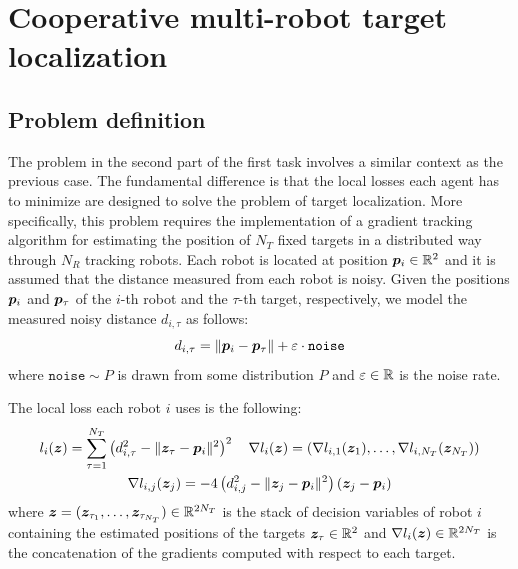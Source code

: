 \documentclass[a4paper,11pt,oneside]{book}
\begin{document}
\chapter{Cooperative multi-robot target localization} \label{ch:localization}


\section{Problem definition}

The problem in the second part of the first task involves a similar context as the previous case. The fundamental difference is that the local losses each agent has to minimize are designed to solve the problem of target localization. More specifically, this problem requires the implementation of a gradient tracking algorithm for estimating the position of $N_T$ fixed targets in a distributed way through $N_R$ tracking robots. Each robot is located at position ${\bm{p}}_i \in {\mathbb{R}}^2$ and it is assumed that the distance measured from each robot is noisy. Given the positions ${\bm{p}}_i$ and ${\bm{p}}_\tau$ of the $i$-th robot and the $\tau$-th target, respectively, we model the measured noisy distance $d_{i,\tau}$ as follows:
\[
      d_{i,\tau} = \Vert {\bm{p}}_i - {\bm{p}}_\tau \Vert + \varepsilon \cdot \texttt{noise}
\]
where $\texttt{noise} \sim P$ is drawn from some distribution $P$ and $\varepsilon \in {\mathbb{R}}$ is the noise rate.

The local loss each robot $i$ uses is the following:
\[
      \begin{gathered}
            l_i({\bm{z}}) = \sum_{\tau=1}^{N_T} \left( d_{i,\tau}^2 - \Vert {\bm{z}}_{\tau} - {\bm{p}}_i \Vert^2 \right)^2
            \quad
            \nabla l_{i}({\bm{z}}) = (\nabla l_{i,1}({\bm{z}}_{1}), \dots, \nabla l_{i,N_T}({\bm{z}}_{N_T}))
            \\
            \nabla l_{i,j}({\bm{z}}_{j}) = -4 \left( d_{i,j}^2 - \Vert {\bm{z}}_{j} - {\bm{p}}_i \Vert^2 \right) \left( {\bm{z}}_{j} - {\bm{p}}_i \right)
      \end{gathered}
\]
where ${\bm{z}} = ({\bm{z}}_{\tau_1}, \dots, {\bm{z}}_{\tau_{N_T}}) \in {\mathbb{R}}^{2N_T}$ is the stack of decision variables of robot $i$ containing the estimated positions of the targets ${\bm{z}}_{\tau} \in {\mathbb{R}}^2$ and $\nabla l_i({\bm{z}}) \in {\mathbb{R}}^{2N_T}$ is the concatenation of the gradients computed with respect to each target.
\end{document}
